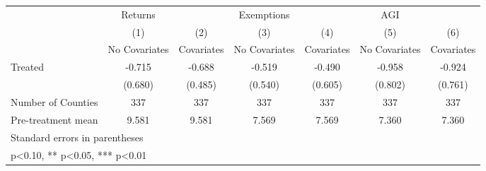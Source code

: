 {
\def\sym#1{\ifmmode^{#1}\else\(^{#1}\)\fi}
\begin{tabular}{l*{6}{c}}
\hline\hline
            &     Returns   &               &  Exemptions   &               &         AGI   &               \\
            &\multicolumn{1}{c}{(1)}&\multicolumn{1}{c}{(2)}&\multicolumn{1}{c}{(3)}&\multicolumn{1}{c}{(4)}&\multicolumn{1}{c}{(5)}&\multicolumn{1}{c}{(6)}\\
            &\multicolumn{1}{c}{No Covariates}&\multicolumn{1}{c}{Covariates}&\multicolumn{1}{c}{No Covariates}&\multicolumn{1}{c}{Covariates}&\multicolumn{1}{c}{No Covariates}&\multicolumn{1}{c}{Covariates}\\
\hline
Treated     &      -0.715   &      -0.688   &      -0.519   &      -0.490   &      -0.958   &      -0.924   \\
            &     (0.680)   &     (0.485)   &     (0.540)   &     (0.605)   &     (0.802)   &     (0.761)   \\
\hline
Number of Counties&         337   &         337   &         337   &         337   &         337   &         337   \\
Pre-treatment mean&       9.581   &       9.581   &       7.569   &       7.569   &       7.360   &       7.360   \\
\hline\hline
\multicolumn{7}{l}{\footnotesize Standard errors in parentheses}\\
\multicolumn{7}{l}{\footnotesize * p<0.10, ** p<0.05, *** p<0.01}\\
\end{tabular}
}
